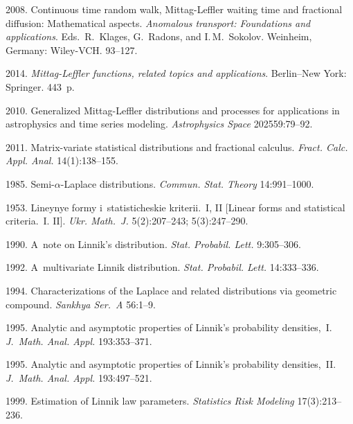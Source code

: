 \begin{multicols}{2}
{{\begin{thebibliography}{99}
 2008. 
{Continuous time random walk, Mittag-Leffler waiting time and fractional 
diffusion: Mathematical aspects}. 
\textit{Anomalous transport: Foundations and applications}.
Eds.\ R.~Klages, G.~Radons, and I.\,M.~Sokolov. 
 Weinheim, Germany: Wiley-VCH. 93--127.

 2014.
\textit{Mittag-Leffler functions, related topics and applications}. 
Berlin--New York: Springer.  443~p.



2010. Generalized Mittag-Leffler distributions and processes 
for applications in astrophysics and time series modeling. 
\textit{Astrophysics Space} 202559:79--92.

 2011. Matrix-variate statistical 
distributions and fractional calculus. \textit{Fract. Calc. Appl. Anal.} 
14(1):138--155.

 1985. Semi-$\alpha$-Laplace distributions.
\textit{Commun. Stat. Theory} 14:991--1000.

1953. Lineynye formy i~statisticheskie kriterii.~I, II 
[Linear forms and statistical criteria.~I. II]. 
\textit{Ukr. Math.~J.} 5(2):207--243; 5(3):247--290.


 1990. A~note on Linnik's distribution. 
\textit{Stat. Probabil. Lett.} 9:305--306.

 1992. A~multivariate Linnik distribution.
\textit{Stat. Probabil. Lett.} 14:333--336.

 1994. Characterizations of the Laplace and related
distributions via geometric compound. \textit{Sankhya Ser.~A}
 56:1--9.


 1995. 
Analytic and asymptotic properties of Linnik's probability densities,~I. 
\textit{J.~Math. Anal. Appl.} 193:353--371.

 1995. Analytic and asymptotic properties of Linnik's probability densities,~II. 
 \textit{J.~Math. Anal. Appl.} 193:497--521.


1999. Estimation of Linnik law parameters. 
\textit{Statistics Risk Modeling} 17(3):213--236.


\end{thebibliography}}}
\end{multicols}
